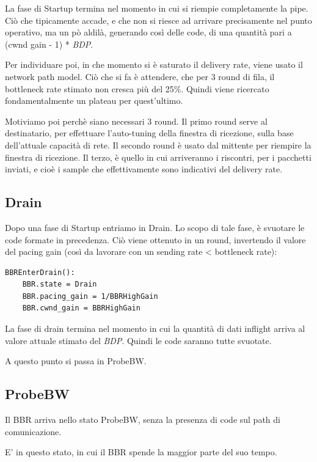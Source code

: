 La fase di Startup termina nel momento in cui si riempie completamente la pipe. Ciò che tipicamente accade, e che non si riesce ad arrivare precisamente nel punto operativo, ma un pò aldilà, generando così delle code, di una quantità pari a (cwnd gain - 1) * \textit{BDP}. \bigskip

Per individuare poi, in che momento si è saturato il delivery rate, viene usato il network path model.
Ciò che si fa è attendere, che per 3 round di fila, il bottleneck rate stimato non cresca più del 25\%. Quindi viene ricercato fondamentalmente un plateau per quest'ultimo. \bigskip

Motiviamo poi perchè siano necessari 3 round. Il primo round serve al destinatario, per effettuare l'auto-tuning della finestra di ricezione, sulla base dell'attuale capacità di rete. Il secondo round è usato dal mittente per riempire la finestra di ricezione. Il terzo, è quello in cui arriveranno i riscontri, per i pacchetti inviati, e cioè i sample che effettivamente sono indicativi del delivery rate.

\subsection{Drain}

Dopo una fase di Startup entriamo in Drain. Lo scopo di tale fase, è svuotare le code formate in precedenza. Ciò viene ottenuto in un round, invertendo il valore del pacing gain (così da lavorare con un sending rate < bottleneck rate):

\begin{lstlisting}[caption=BBREnterDrain]
BBREnterDrain():
	BBR.state = Drain
	BBR.pacing_gain = 1/BBRHighGain
	BBR.cwnd_gain = BBRHighGain

\end{lstlisting}

La fase di drain termina nel momento in cui la quantità di dati inflight arriva al valore attuale stimato del \textit{BDP}. Quindi le code saranno tutte svuotate. \bigskip

A questo punto si passa in ProbeBW.

\subsection{ProbeBW} \label{ProbeBW}

Il BBR arriva nello stato ProbeBW, senza la presenza di code sul path di comunicazione. \bigskip

E' in questo stato, in cui il BBR spende la maggior parte del suo tempo. \bigskip

